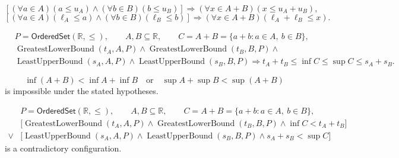 \begin{remark*}
\[
\left[(\forall a\in A)(a\leq u_A)\land
(\forall b\in B)(b\leq u_B)\right]
\Longrightarrow
(\forall x\in A+B)(x\leq u_A+u_B),
\]
\[
\left[(\forall a\in A)(\ell_A\leq a)\land
(\forall b\in B)(\ell_B\leq b)\right]
\Longrightarrow
(\forall x\in A+B)(\ell_A+\ell_B\leq x).
\]
\end{remark*}

\begin{remark*}
\[
\begin{aligned}
&P=\mathsf{OrderedSet}(\mathbb{R},\leq),\qquad
A,B\subseteq\mathbb{R},\qquad C=A+B=\{a+b:a\in A,\ b\in B\},\\
&\operatorname{GreatestLowerBound}(t_A,A,P)\land
\operatorname{GreatestLowerBound}(t_B,B,P)\land\\
&\operatorname{LeastUpperBound}(s_A,A,P)\land
\operatorname{LeastUpperBound}(s_B,B,P)
\Longrightarrow
t_A+t_B\leq \inf C\leq \sup C\leq s_A+s_B.
\end{aligned}
\]
\end{remark*}

\begin{remark*}
\[
\inf(A+B)<\inf A+\inf B
\quad\text{or}\quad
\sup A+\sup B<\sup(A+B)
\]
is impossible under the stated hypotheses.
\end{remark*}

\begin{remark*}
\[
\begin{aligned}
&P=\mathsf{OrderedSet}(\mathbb{R},\leq),\qquad
A,B\subseteq\mathbb{R},\qquad C=A+B=\{a+b:a\in A,\ b\in B\},\\
&\bigl[\operatorname{GreatestLowerBound}(t_A,A,P)\land
\operatorname{GreatestLowerBound}(t_B,B,P)\land \inf C<t_A+t_B\bigr]\\
\lor
&\bigl[\operatorname{LeastUpperBound}(s_A,A,P)\land
\operatorname{LeastUpperBound}(s_B,B,P)\land s_A+s_B<\sup C\bigr]
\end{aligned}
\]
is a contradictory configuration.
\end{remark*}

